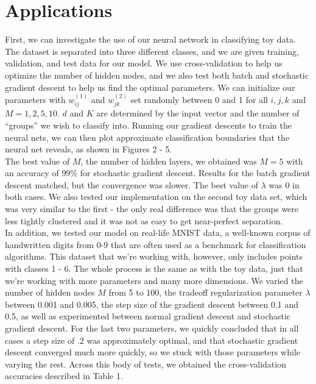 \documentclass[11pt,letterpaper]{article}
\begin{document}
\section{Applications}
First, we can investigate the use of our neural network in classifying toy data. The dataset is separated into three different classes, and we are given training, validation, and test data for our model. We use cross-validation to help us optimize the number of hidden nodes, and we also test both batch and stochastic gradient descent to help us find the optimal parameters. We can initialize our parameters with $w^{(1)}_{ij}$ and $w^{(2)}_{jk}$ set randomly between 0 and 1 for all $i,j,k$ and $M=1,2,5,10$. $d$ and $K$ are determined by the input vector and the number of ``groups'' we wish to classify into. Running our gradient descents to train the neural nets, we can then plot approximate classification boundaries that the neural net reveals, as shown in Figures 2 - 5.\\

The best value of $M$, the number of hidden layers, we obtained was $M=5$ with an accuracy of $99\%$ for stochastic gradient descent. Results for the batch gradient descent matched, but the convergence was slower. The best value of $\lambda$ was 0 in both cases. We also tested our implementation on the second toy data set, which was very similar to the first - the only real difference was that the groups were less tightly clustered and it was not as easy to get near-perfect separation.\\

In addition, we tested our model on real-life MNIST data, a well-known corpus of handwritten digits from 0-9 that are often used as a benchmark for classification algorithms. This dataset that we're working with, however, only includes points with classes 1 - 6. The whole process is the same as with the toy data, just that we're working with more parameters and many more dimensions. We varied the number of hidden nodes $M$ from 5 to 100, the tradeoff regularization parameter $\lambda$ between 0.001 and 0.005, the step size of the gradient descent between 0.1 and 0.5, as well as experimented between normal gradient descent and stochastic gradient descent. For the last two parameters, we quickly concluded that in all cases a step size of .2 was approximately optimal, and that stochastic gradient descent converged much more quickly, so we stuck with those parameters while varying the rest. Across this body of tests, we obtained the cross-validation accuracies described in Table 1.\\
\end{document}

